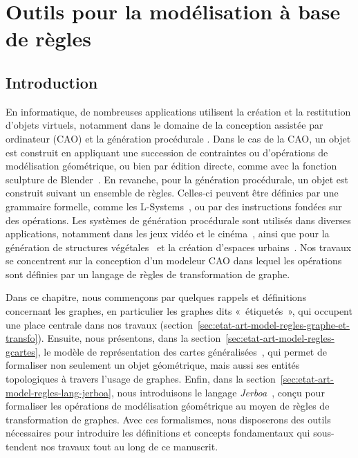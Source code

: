 \chapter{Outils pour la modélisation à base de règles}
\label{cha:outils-modelisation-base-regles}

\section{Introduction}
\label{sec:outils-modelisation-base-regles-introduction}

En informatique, de nombreuses applications utilisent la création et la restitution d'objets virtuels, notamment dans le domaine de la conception assistée par ordinateur (CAO) et la
génération procédurale \cite{dassaultCATIA,siemensNX,OCAF,dassaultSOLIDWORKS}. %
Dans le cas de la CAO, un objet est construit en appliquant une succession de contraintes ou d'opérations de modélisation géométrique, ou bien par édition directe, comme avec la fonction sculpture de Blender~\cite{blender}. %
En revanche, pour la génération procédurale, un objet est construit suivant un ensemble de règles. Celles-ci peuvent être définies par une grammaire formelle, comme les L-Systems~\cite{lindenmayer1974adding}, ou par des instructions fondées sur des opérations. %
Les systèmes de génération procédurale sont utilisés dans diverses applications, notamment dans les jeux vidéo et le cinéma~\cite{autodesk3ds,autodeskMaya,godotEngine,unityEngine,unrealEngine}, ainsi que pour la génération de structures végétales~\cite{terraz20093gmap,bohl2015modeling} et la création d'espaces urbains~\cite{esri2023cityengine}. %
Nos travaux se concentrent sur la conception d’un modeleur CAO dans lequel les opérations sont définies par un langage de règles de transformation de graphe. %

Dans ce chapitre, nous commençons par quelques rappels et définitions concernant les graphes, en particulier les graphes dits «~étiquetés~», qui occupent une place centrale dans nos travaux (section~\ref{sec:etat-art-model-regles-graphe-et-transfo}). Ensuite, nous présentons, dans la section~\ref{sec:etat-art-model-regles-gcartes}, le modèle de représentation des cartes généralisées~\cite{lienhardt1994n,Damiand-Lienhardt14}, qui permet de formaliser non seulement un objet géométrique, mais aussi ses entités topologiques à travers l'usage de graphes.
Enfin, dans la section~\ref{sec:etat-art-model-regles-lang-jerboa}, nous introduisons le langage \emph{Jerboa}~\cite{belhaouari2014jerboa}, conçu pour formaliser les opérations de modélisation géométrique au moyen de règles de transformation de graphes. %
Avec ces formalismes, nous disposerons des outils nécessaires pour introduire les définitions et concepts fondamentaux qui sous-tendent nos travaux tout au long de ce manuscrit. %



